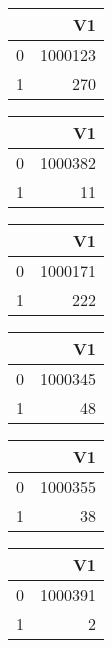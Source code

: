 \bigskip\bigskip
\centering
\begin{tabular}{rr}
  \hline
 & V1 \\ 
  \hline
0 & 1000123 \\ 
  1 & 270 \\ 
   \hline
\end{tabular}

\bigskip\bigskip
\centering
\begin{tabular}{rr}
  \hline
 & V1 \\ 
  \hline
0 & 1000382 \\ 
  1 &  11 \\ 
   \hline
\end{tabular}

\bigskip\bigskip
\centering
\begin{tabular}{rr}
  \hline
 & V1 \\ 
  \hline
0 & 1000171 \\ 
  1 & 222 \\ 
   \hline
\end{tabular}

\bigskip\bigskip
\centering
\begin{tabular}{rr}
  \hline
 & V1 \\ 
  \hline
0 & 1000345 \\ 
  1 &  48 \\ 
   \hline
\end{tabular}

\bigskip\bigskip
\centering
\begin{tabular}{rr}
  \hline
 & V1 \\ 
  \hline
0 & 1000355 \\ 
  1 &  38 \\ 
   \hline
\end{tabular}

\bigskip\bigskip
\centering
\begin{tabular}{rr}
  \hline
 & V1 \\ 
  \hline
0 & 1000391 \\ 
  1 &   2 \\ 
   \hline
\end{tabular}


